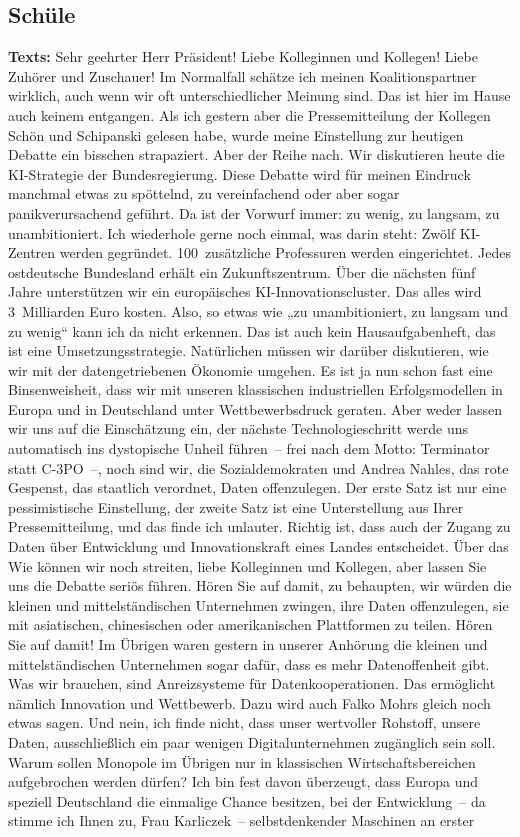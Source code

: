 \documentclass{article}
\begin{document}
\subsection{Schüle}
\noindent\textbf{Texts:} Sehr geehrter Herr Präsident! Liebe Kolleginnen und Kollegen! Liebe Zuhörer und Zuschauer! Im Normalfall schätze ich meinen Koalitionspartner wirklich, auch wenn wir oft unterschiedlicher Meinung sind. Das ist hier im Hause auch keinem entgangen. Als ich gestern aber die Pressemitteilung der Kollegen Schön und Schipanski gelesen habe, wurde meine Einstellung zur heutigen Debatte ein bisschen strapaziert. Aber der Reihe nach. Wir diskutieren heute die KI-Strategie der Bundesregierung. Diese Debatte wird für meinen Eindruck manchmal etwas zu spöttelnd, zu vereinfachend oder aber sogar panikverursachend geführt. Da ist der Vorwurf immer: zu wenig, zu langsam, zu unambitioniert. Ich wiederhole gerne noch einmal, was darin steht: Zwölf KI-Zentren werden gegründet. 100 zusätzliche Professuren werden eingerichtet. Jedes ostdeutsche Bundesland erhält ein Zukunftszentrum. Über die nächsten fünf Jahre unterstützen wir ein europäisches KI-Innovationscluster.  Das alles wird 3 Milliarden Euro kosten. Also, so etwas wie „zu unambitioniert, zu langsam und zu wenig“ kann ich da nicht erkennen. Das ist auch kein Hausaufgabenheft, das ist eine Umsetzungsstrategie. Natürlichen müssen wir darüber diskutieren, wie wir mit der datengetriebenen Ökonomie umgehen. Es ist ja nun schon fast eine Binsenweisheit, dass wir mit unseren klassischen industriellen Erfolgsmodellen in Europa und in Deutschland unter Wettbewerbsdruck geraten. Aber weder lassen wir uns auf die Einschätzung ein, der nächste Technologieschritt werde uns automatisch ins dystopische Unheil führen – frei nach dem Motto: Terminator statt C-3PO –, noch sind wir, die Sozialdemokraten und Andrea Nahles, das rote Gespenst, das staatlich verordnet, Daten offenzulegen. Der erste Satz ist nur eine pessimistische Einstellung, der zweite Satz ist eine Unterstellung aus Ihrer Pressemitteilung, und das finde ich unlauter.  Richtig ist, dass auch der Zugang zu Daten über Entwicklung und Innovationskraft eines Landes entscheidet. Über das Wie können wir noch streiten, liebe Kolleginnen und Kollegen, aber lassen Sie uns die Debatte seriös führen. Hören Sie auf damit, zu behaupten, wir würden die kleinen und mittelständischen Unternehmen zwingen, ihre Daten offenzulegen, sie mit asiatischen, chinesischen oder amerikanischen Plattformen zu teilen. Hören Sie auf damit! Im Übrigen waren gestern in unserer Anhörung die kleinen und mittelständischen Unternehmen sogar dafür, dass es mehr Datenoffenheit gibt.  Was wir brauchen, sind Anreizsysteme für Datenkooperationen. Das ermöglicht nämlich Innovation und Wettbewerb. Dazu wird auch Falko Mohrs gleich noch etwas sagen. Und nein, ich finde nicht, dass unser wertvoller Rohstoff, unsere Daten, ausschließlich ein paar wenigen Digitalunternehmen zugänglich sein soll.  Warum sollen Monopole im Übrigen nur in klassischen Wirtschaftsbereichen aufgebrochen werden dürfen? Ich bin fest davon überzeugt, dass Europa und speziell Deutschland die einmalige Chance besitzen, bei der Entwicklung – da stimme ich Ihnen zu, Frau Karliczek – selbstdenkender Maschinen an erster 
\end{document}
